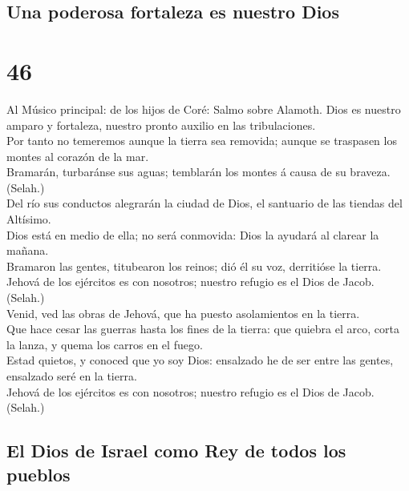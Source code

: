 \hypertarget{una-poderosa-fortaleza-es-nuestro-dios}{%
\subsection{Una poderosa fortaleza es nuestro
Dios}\label{una-poderosa-fortaleza-es-nuestro-dios}}

\hypertarget{section-45}{%
\section{46}\label{section-45}}

 Al Músico principal: de los hijos de Coré: Salmo sobre
Alamoth. Dios es nuestro amparo y fortaleza, nuestro pronto auxilio en
las tribulaciones.\\
 Por tanto no temeremos aunque la tierra sea removida;
aunque se traspasen los montes al corazón de la mar.\\
 Bramarán, turbaránse sus aguas; temblarán los montes á
causa de su braveza. (Selah.)\\
 Del río sus conductos alegrarán la ciudad de Dios, el
santuario de las tiendas del Altísimo.\\
 Dios está en medio de ella; no será conmovida: Dios la
ayudará al clarear la mañana.\\
 Bramaron las gentes, titubearon los reinos; dió él su
voz, derritióse la tierra.\\
 Jehová de los ejércitos es con nosotros; nuestro refugio
es el Dios de Jacob. (Selah.)\\
 Venid, ved las obras de Jehová, que ha puesto
asolamientos en la tierra.\\
 Que hace cesar las guerras hasta los fines de la tierra:
que quiebra el arco, corta la lanza, y quema los carros en el fuego.\\
 Estad quietos, y conoced que yo soy Dios: ensalzado he
de ser entre las gentes, ensalzado seré en la tierra.\\
 Jehová de los ejércitos es con nosotros; nuestro refugio
es el Dios de Jacob. (Selah.)

\hypertarget{el-dios-de-israel-como-rey-de-todos-los-pueblos}{%
\subsection{El Dios de Israel como Rey de todos los
pueblos}\label{el-dios-de-israel-como-rey-de-todos-los-pueblos}}

